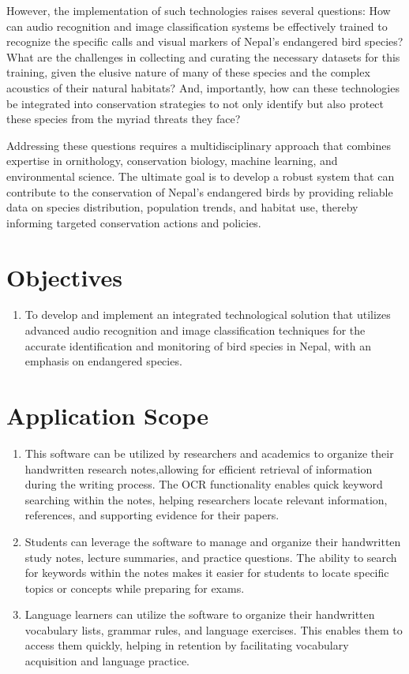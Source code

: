 However, the implementation of such technologies raises several questions: How can audio recognition and image classification systems be effectively trained to recognize the specific calls and visual markers of Nepal's endangered bird species? What are the challenges in collecting and curating the necessary datasets for this training, given the elusive nature of many of these species and the complex acoustics of their natural habitats? And, importantly, how can these technologies be integrated into conservation strategies to not only identify but also protect these species from the myriad threats they face?

Addressing these questions requires a multidisciplinary approach that combines expertise in ornithology, conservation biology, machine learning, and environmental science. The ultimate goal is to develop a robust system that can contribute to the conservation of Nepal's endangered birds by providing reliable data on species distribution, population trends, and habitat use, thereby informing targeted conservation actions and policies.

\section{Objectives}
\begin{enumerate}[label=\roman*]
    \item To develop and implement an integrated technological solution that utilizes advanced audio recognition and image classification techniques for the accurate identification and monitoring of bird species in Nepal, with an emphasis on endangered species.
\end{enumerate}

\section{Application Scope}
 \begin{enumerate}
    \item This software can be utilized by researchers and academics to organize their
    handwritten research notes,allowing for efficient retrieval of information during
    the writing process. The OCR functionality enables quick keyword searching
    within the notes, helping researchers locate relevant information, references, and
    supporting evidence for their papers.
    \item Students can leverage the software to manage and organize their handwritten
    study notes, lecture summaries, and practice questions. The ability to search for
    keywords within the notes makes it easier for students to locate specific topics or
    concepts while preparing for exams.
    \item Language learners can utilize the software to organize their handwritten
    vocabulary lists, grammar rules, and language exercises. This enables them to
    access them quickly, helping in retention by facilitating vocabulary acquisition
    and language practice.
 \end{enumerate}
